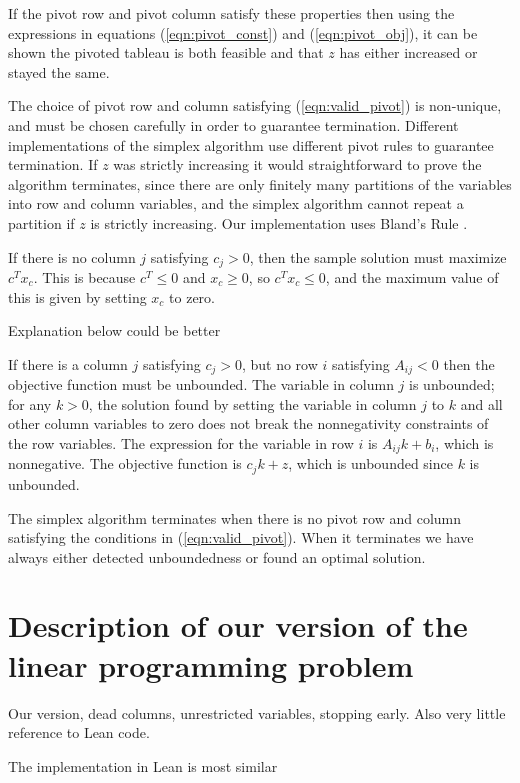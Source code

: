 \documentclass[11pt]{article} %
\begin{document}
If the pivot row and pivot column satisfy these properties then using the expressions in equations (\ref{eqn:pivot_const}) and (\ref{eqn:pivot_obj}), it can be shown the pivoted tableau is both feasible and that $z$ has either increased or stayed the same.

The choice of pivot row and column satisfying (\ref{eqn:valid_pivot}) is non-unique, and must be chosen carefully in order to guarantee termination. Different implementations of the simplex algorithm use different pivot rules to guarantee termination. If $z$ was strictly increasing it would straightforward to prove the algorithm terminates, since there are only finitely many partitions of the variables into row and column variables, and the simplex algorithm cannot repeat a partition if $z$ is strictly increasing.   Our implementation uses Bland's Rule \cite{Blands_rule}.

If there is no column $j$ satisfying $c_j > 0$, then the sample solution must maximize $c^Tx_c$. This is because $c^T \le 0$ and $x_c \ge 0$, so $c^Tx_c \le 0$, and the maximum value of this is given by setting $x_c$ to zero.

\color{red} Explanation below could be better\color{black}

If there is a column $j$ satisfying $c_j > 0$, but no row $i$ satisfying $A_{ij} < 0$ then the objective function must be unbounded. The variable in column $j$ is unbounded; for any $k > 0$, the solution found by setting the variable in column $j$ to $k$ and all other column variables to zero does not break the nonnegativity constraints of the row variables. The expression for the variable in row $i$ is $A_{ij}k + b_i$, which is nonnegative. The objective function is $c_jk+z$, which is unbounded since $k$ is unbounded.

The simplex algorithm terminates when there is no pivot row and column satisfying the conditions in (\ref{eqn:valid_pivot}). When it terminates we have always either detected unboundedness or found an optimal solution.

\section{Description of our version of the linear programming problem}
\color{red} Our version, dead columns, unrestricted variables, stopping early. Also very little reference to Lean code. \color{black}

The implementation in Lean is most similar
\end{document}
